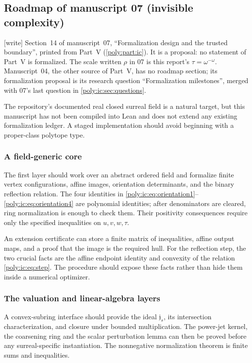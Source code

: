 \documentclass[11pt,a4paper]{article}
\numberwithin{equation}{section}
\theoremstyle{plain}
\newcommand{\wtag}{\textup{[write]}}%
\newcommand{\JJ}{\mathfrak j}
\begin{document}
\subsection{Roadmap of manuscript 07 (invisible complexity)}\label{poly:ic:sec:formalization}
\wtag{} Section~14 of manuscript~07, ``Formalization design and the trusted
boundary'', printed from Part~V (\cref{poly:part:ic}). It is a proposal: no
statement of Part~V is formalized. The scale written $\rho$ in 07 is this
report's $\tau=\omega^{-\omega}$. Manuscript~04, the other source of Part~V,
has no roadmap section; its formalization proposal is its research
question ``Formalization milestones'', merged with 07's last question in
\cref{poly:ic:sec:questions}.

The repository's documented real closed surreal field is a natural target,
but this manuscript has not been compiled into Lean and does not extend
any existing formalization ledger. A staged implementation should avoid
beginning with a proper-class polytope type.

\subsubsection{A field-generic core}
The first layer should work over an abstract ordered field and formalize
finite vertex configurations, affine images, orientation determinants,
and the binary reflection relation. The four identities in
\eqref{poly:ic:eq:orientation1}--\eqref{poly:ic:eq:orientation4} are polynomial
identities; after denominators are cleared, ring normalization is enough
to check them. Their positivity consequences require only the specified
inequalities on $u,v,w,\tau$.

An extension certificate can store a finite matrix of inequalities,
affine output maps, and a proof that the image is the required hull.
For the reflection step, the two crucial facts are the affine endpoint
identity and convexity of the relation \eqref{poly:ic:eq:step}. The procedure
should expose these facts rather than hide them inside a numerical
optimizer.

\subsubsection{The valuation and linear-algebra layers}
A convex-subring interface should provide the ideal $\JJ_s$, its
intersection characterization, and closure under bounded multiplication.
The power-jet kernel, the coarsening ring and the scalar perturbation
lemma can then be proved before any surreal-specific instantiation.
The nonnegative normalization theorem is finite sums and inequalities.
\end{document}
